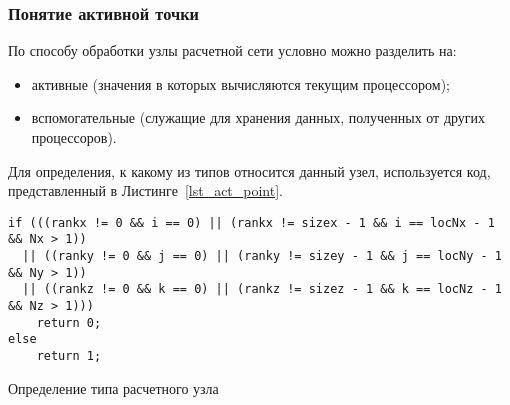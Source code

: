 \subsubsection{Понятие активной точки}
По способу обработки узлы расчетной сети условно можно
разделить на:
\begin{itemize}
 \item активные (значения в которых вычисляются текущим процессором);
 \item вспомогательные (служащие для хранения данных, полученных от
 других процессоров).
\end{itemize}
Для определения, к какому из типов относится данный узел,
используется код, представленный в Листинге~\ref{lst_act_point}.
\begin{listing}[!h]
\begin{verbatim}
if (((rankx != 0 && i == 0) || (rankx != sizex - 1 && i == locNx - 1 && Nx > 1))
  || ((ranky != 0 && j == 0) || (ranky != sizey - 1 && j == locNy - 1 && Ny > 1))
  || ((rankz != 0 && k == 0) || (rankz != sizez - 1 && k == locNz - 1 && Nz > 1)))
    return 0;
else
    return 1;
\end{verbatim}
\caption{Определение типа расчетного узла}
\label{lst_act_point}
\end{listing}


